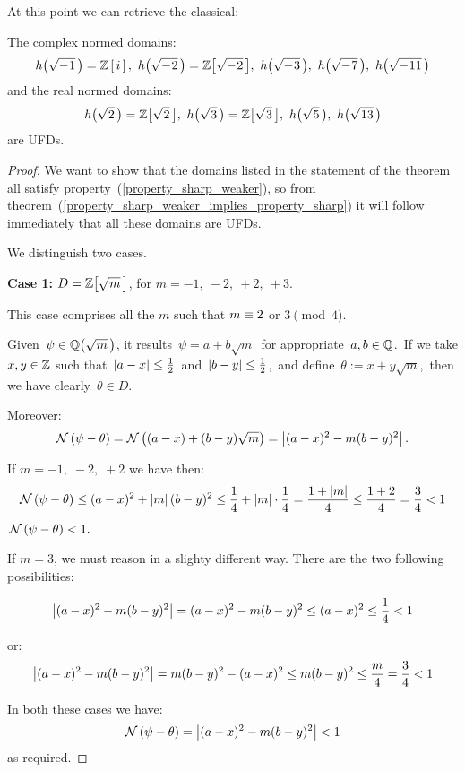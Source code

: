 At this point we can retrieve the classical:

\begin{thm}\label{normed_UFDs_1}
The complex normed domains:
$$
\hhm{1} = \Z\left[\,i\,\right],\ \hhm{2} = \ZZM{2},
\ \hhm{3},\ \hhm{7},\ \hhm{11}
$$
and the real normed domains:
$$
\hh{2} = \ZZ{2},\ \hh{3} = \ZZ{3},\ \hh{5},\ \hh{13}
$$
are UFDs.
\end{thm}

\begin{proof}
%
We want to show that the domains listed in the statement
of the theorem all satisfy property~(\ref{property_sharp_weaker}),
so from theorem~(\ref{property_sharp_weaker_implies_property_sharp})
it will follow immediately that all these domains are UFDs.

We distinguish two cases.

\smallskip

\textbf{Case 1:} $ D = \ZZ{m}$, for $m = -1,\: -2,\: +2,\: +3$.

This case comprises all the $m$ such that $m \equiv 2$ or $3 \pmod 4$.

Given\, $\psi \in \QQ{m}$, it results
\,$\psi = a + b\sqrt{m}$\, for appropriate\, $a,b\in\mathbb{Q}$.
\,If we take $x,y \in \mathbb{Z}$ such that\,
$\left|a - x\right| \leq \frac{1}{2}$\, and\,
$\left|b - y\right| \leq \frac{1}{2}$,\, and define\,
$\theta := x + y\sqrt{m}$,\, then we have clearly\,
$\theta \in D$.

Moreover:
$$
\mathcal{N}\left(\psi - \theta\right) = \mathcal{N}\left((a - x) + (b - y)\sqrt{m}\right)
= \left|(a - x)^2 - m(b - y)^2\right|.
$$

If $m = -1,\; -2,\; +2$ we have then:
$$
\mathcal{N}\left(\psi - \theta\right) \leq (a - x)^2 + \left|m\right|(b - y)^2
\leq \frac{1}{4} + \left|m\right| \cdot \frac{1}{4}
= \frac{1 + \left|m\right|}{4} \leq \frac{1 + 2}{4} =
\frac{3}{4} < 1
$$
\ie \,$\mathcal{N}\left(\psi - \theta\right) < 1.$

If $m = 3$, we must reason in a slighty different way.
There are the two following possibilities:

$$
\left|(a - x)^2 - m (b - y)^2\right| = (a - x)^2 - m (b - y)^2
\leq (a - x)^2 \leq \frac{1}{4} < 1
$$

or:
$$
\left|(a - x)^2 - m (b - y)^2\right| = m (b - y)^2 - (a - x)^2
\leq m(b - y)^2 \leq \frac{m}{4} = \frac{3}{4} < 1
$$

In both these cases we have:
$$
\mathcal{N}\left(\psi - \theta\right) = \left|(a - x)^2 - m (b-y)^2\right| < 1
$$
as required.


\end{proof}
